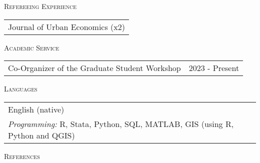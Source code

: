 \documentclass[11pt]{amsart}
\begin{document}
\vspace{0.4cm}

\LARGE
\textsc{Refereeing Experience}
\vspace{0.2cm}
\normalsize

\begin{tabular}{ p{17.5cm} }
Journal of Urban Economics (x2)  \\
\end{tabular}
 

\vspace{0.4cm}
\LARGE
\textsc{Academic Service}
\vspace{0.2cm}

\normalsize
\begin{tabular}{ p{12.5cm} p{5cm}}
Co-Organizer of the Graduate Student Workshop  & 2023 - Present  \\
\end{tabular}

\vspace{0.4cm}
\LARGE
\textsc{Languages}
\vspace{0.2cm}

\normalsize
\begin{tabular}{ p{17.5cm}}
  English (native)  \\
  \emph{Programming:} R, Stata, Python, SQL, MATLAB, GIS (using R, Python and QGIS)
\end{tabular}


\vspace{0.4cm}
\LARGE
\textsc{References}
\vspace{0.2cm}
\end{document}
